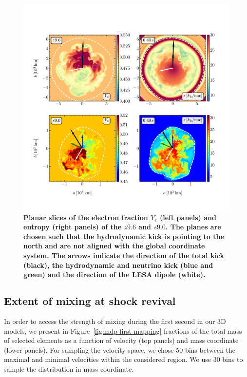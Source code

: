 \documentclass[fleqn,usenatbib]{mnras}
\begin{document}
\begin{figure}
 \centering
 \includegraphics[width=\textwidth,trim=0cm 1.3cm 0cm 2cm,clip]{pic/z9_s9_3d_ye_sto_kick_slices.pdf}
 \caption{\textbf{Planar slices of the electron fraction $Y_{e}$ (left panels) and entropy (right panels) of the $z9.6$ and $s9.0$. The planes are chosen such that the hydrodynamic kick is pointing to the north and are not aligned with the global coordinate system. The arrows indicate the direction of the total kick (black), the hydrodynamic and neutrino kick (blue and green) and the direction of the LESA dipole (white).}}
 \label{fig:sto ye s9 z9 kick}
\end{figure}

\subsection{Extent of mixing at shock revival}
\label{sec:Extent of mixing at shock revival}

In order to access the strength of mixing during the first second in our 3D models, we present in Figure~\ref{fig:mdp first mapping} fractions of the total mass of selected elements as a function of velocity (top panels) and mass coordinate (lower panels). 
For sampling the velocity space, we chose 50 bins between the maximal and minimal velocities within the considered region. We use 30 bins to sample the distribution in mass coordinate.
\end{document}
